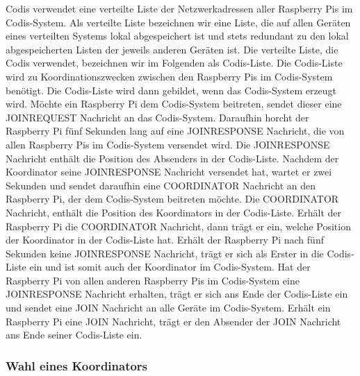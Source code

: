 \documentclass[journal]{IEEEtran}
\begin{document}
Codis verwendet eine verteilte Liste der Netzwerkadressen aller Raspberry Pis im Codis-System. Als verteilte Liste bezeichnen wir eine Liste, die auf allen Geräten eines verteilten Systems lokal abgespeichert ist und stets redundant zu den lokal abgespeicherten Listen der jeweils anderen Geräten ist. Die verteilte Liste, die Codis verwendet, bezeichnen wir im Folgenden als Codis-Liste. Die Codis-Liste wird zu Koordinationszwecken zwischen den Raspberry Pis im Codis-System benötigt.
Die Codis-Liste wird dann gebildet, wenn das Codis-System erzeugt wird. Möchte ein Raspberry Pi dem Codis-System beitreten, sendet dieser eine \MakeUppercase{joinrequest} Nachricht an das Codis-System. Daraufhin horcht der Raspberry Pi fünf Sekunden lang auf eine \MakeUppercase{joinresponse} Nachricht, die von allen Raspberry Pis im Codis-System versendet wird. Die \MakeUppercase{joinresponse} Nachricht enthält die Position des Absenders in der Codis-Liste. Nachdem der Koordinator seine \MakeUppercase{joinresponse} Nachricht versendet hat, wartet er zwei Sekunden und sendet daraufhin eine \MakeUppercase{coordinator} Nachricht an den Raspberry Pi, der dem Codis-System beitreten möchte. Die \MakeUppercase{coordinator} Nachricht, enthält die Position des Koordinators in der Codis-Liste. Erhält der Raspberry Pi die \MakeUppercase{coordinator} Nachricht, dann trägt er ein, welche Position der Koordinator in der Codis-Liste hat. Erhält der Raspberry Pi nach fünf Sekunden keine \MakeUppercase{joinresponse} Nachricht, trägt er sich als Erster in die Codis-Liste ein und ist somit auch der Koordinator im Codis-System. Hat der Raspberry Pi von allen anderen Raspberry Pis im Codis-System eine \MakeUppercase{joinresponse} Nachricht erhalten, trägt er sich ans Ende der Codis-Liste ein und sendet eine \MakeUppercase{join} Nachricht an alle Geräte im Codis-System. Erhält ein Raspberry Pi eine \MakeUppercase{join} Nachricht, trägt er den Absender der \MakeUppercase{join} Nachricht ans Ende seiner Codis-Liste ein.

\subsubsection{Wahl eines Koordinators}
\end{document}
